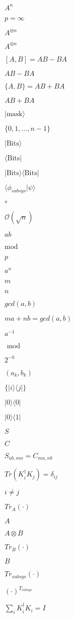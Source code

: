 \documentclass{article}
\begin{document}
$A^n$
\pagebreak

$p = \infty$
\pagebreak

$A^{\otimes n}$
\pagebreak

$A^{\oplus n}$
\pagebreak

$ [A,B] = AB - BA $
\pagebreak

$AB -BA$
\pagebreak

$ \{A,B\} = AB + BA $
\pagebreak

$AB +BA$
\pagebreak

$|\mathrm{mask}\rangle$
\pagebreak

$\{0, 1, \ldots, n - 1\}$
\pagebreak

$|\mathrm{Bits}\rangle$
\pagebreak

$\langle\mathrm{Bits}|$
\pagebreak

$|\mathrm{Bits}\rangle\langle\mathrm{Bits}|$
\pagebreak

$\langle \phi_{subsys}|\psi\rangle$
\pagebreak

$\circ$
\pagebreak

$\mathcal{O}(\sqrt{n})$
\pagebreak

$ab$
\pagebreak

$\mathrm{ mod }$
\pagebreak

$p$
\pagebreak

$a^n$
\pagebreak

$m$
\pagebreak

$n$
\pagebreak

$gcd(a, b)$
\pagebreak

$ma + nb = gcd(a, b)$
\pagebreak

$a^{-1}$
\pagebreak

$\textrm{ mod }$
\pagebreak

$2^{-k}$
\pagebreak

$ (a_k, b_k) $
\pagebreak

$\{|i\rangle\langle j|\}$
\pagebreak

$|0\rangle\langle 0|$
\pagebreak

$|0\rangle\langle 1|$
\pagebreak

$S$
\pagebreak

$ C$
\pagebreak

$ S_{ab,mn} = C_{ma,nb}$
\pagebreak

$Tr(K_i^\dagger K_j)=\delta_{ij}$
\pagebreak

$i\neq j$
\pagebreak

$Tr_{A}(\cdot)$
\pagebreak

$A$
\pagebreak

$A\otimes B$
\pagebreak

$Tr_{B}(\cdot)$
\pagebreak

$B$
\pagebreak

$Tr_{subsys}(\cdot)$
\pagebreak

$(\cdot)^{T_{subsys}}$
\pagebreak

$ \sum_i K_i^\dagger K_i = I$
\pagebreak
\end{document}
